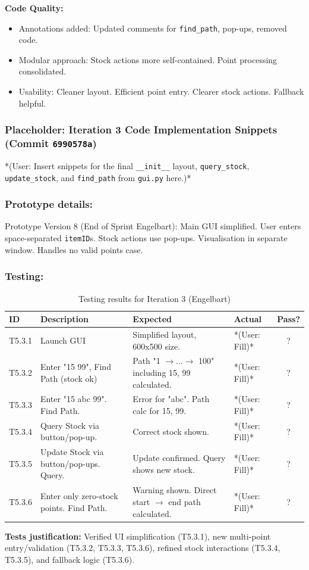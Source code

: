 \textbf{Code Quality:}
\begin{itemize}
	\item Annotations added: Updated comments for \verb|find_path|, pop-ups, removed code.
	\item Modular approach: Stock actions more self-contained. Point processing consolidated.
	\item Usability: Cleaner layout. Efficient point entry. Clearer stock actions. Fallback helpful.
\end{itemize}

\newpage
\subsubsection*{Placeholder: Iteration 3 Code Implementation Snippets (Commit \verb|6990578a|)}
*(User: Insert snippets for the final \verb|__init__| layout, \verb|query_stock|, \verb|update_stock|, and \verb|find_path| from \verb|gui.py| here.)*
\newpage

\subsubsection{Prototype details:}
Prototype Version 8 (End of Sprint Engelbart): Main GUI simplified. User enters space-separated \verb|itemID|s. Stock actions use pop-ups. Visualisation in separate window. Handles no valid points case.

\subsubsection{Testing:}
\begin{table}[htbp]
	\centering
	\begin{tabularx}{\textwidth}{|l|X|p{4.5cm}|p{1.5cm}|c|}
		\hline
		\textbf{ID} & \textbf{Description} & \textbf{Expected} & \textbf{Actual} & \textbf{Pass?} \\
		\hline
		T5.3.1 & Launch GUI & Simplified layout, 600x500 size. & *(User: Fill)* & ? \\
		\hline
		T5.3.2 & Enter "15 99", Find Path (stock ok) & Path "1 $ \rightarrow $...$ \rightarrow $ 100" including 15, 99 calculated. & *(User: Fill)* & ? \\
		\hline
		T5.3.3 & Enter "15 abc 99". Find Path. & Error for "abc". Path calc for 15, 99. & *(User: Fill)* & ? \\
		\hline
		T5.3.4 & Query Stock via button/pop-up. & Correct stock shown. & *(User: Fill)* & ? \\
		\hline
		T5.3.5 & Update Stock via button/pop-ups. Query. & Update confirmed. Query shows new stock. & *(User: Fill)* & ? \\
		\hline
		T5.3.6 & Enter only zero-stock points. Find Path. & Warning shown. Direct start $ \rightarrow $ end path calculated. & *(User: Fill)* & ? \\
		\hline
	\end{tabularx}
	\caption{Testing results for Iteration 3 (Engelbart)}
\end{table}
\textbf{Tests justification:} Verified UI simplification (T5.3.1), new multi-point entry/validation (T5.3.2, T5.3.3, T5.3.6), refined stock interactions (T5.3.4, T5.3.5), and fallback logic (T5.3.6).


